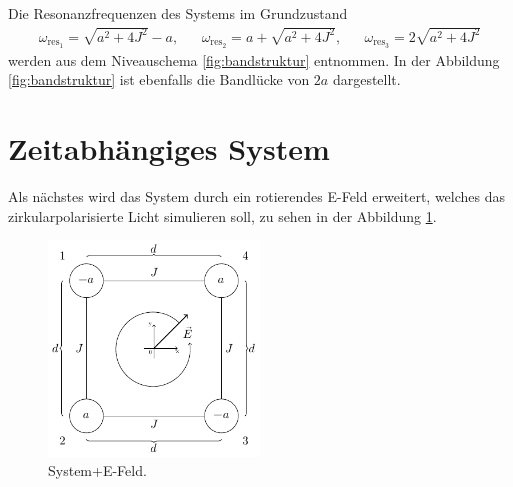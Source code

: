 Die Resonanzfrequenzen des Systems im Grundzustand
\begin{align}
\omega_{\text{res}_1}=\sqrt{a^2+4J^2}-a,
& &\omega_{\text{res}_2}=a+\sqrt{a^2+4J^2},
& &\omega_{\text{res}_3}=2\sqrt{a^2+4J^2}
\end{align}
werden aus dem Niveauschema \ref{fig:bandstruktur} entnommen. In der Abbildung \ref{fig:bandstruktur} ist ebenfalls die Bandlücke von $2a$
dargestellt.

\section{Zeitabhängiges System}
Als nächstes wird das System durch ein rotierendes E-Feld erweitert, welches
das zirkularpolarisierte Licht simulieren soll, zu sehen in der Abbildung \ref{fig:syst+E}.

\begin{figure}
   \centering
   \includegraphics[width=0.5\textwidth]{Programme/Tikz_test/bild_gitter.pdf}
   \caption{System+E-Feld.}
   \label{fig:syst+E}
\end{figure}


